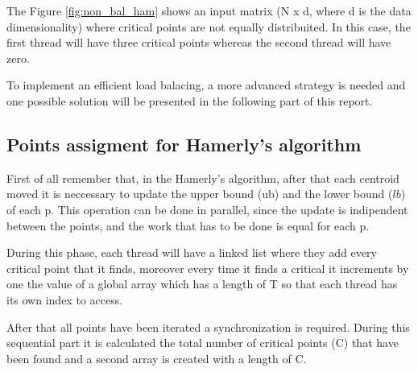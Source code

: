\documentclass{report}
\begin{document}
\begin{minipage}[b]{0.48\textwidth}
    The Figure \ref{fig:non_bal_ham} shows an input matrix (N x d, where d is the data dimensionality) where critical points are not  equally distribuited. In this case, the first thread will have three critical points whereas the second thread will have zero.

    To implement an efficient load balacing, a more advanced strategy is needed and one possible solution will be presented in the following part of this report. 
    
    \subsection*{Points assigment for Hamerly's algorithm}
    First of all remember that, in the Hamerly's algorithm, after that each centroid moved it is neccessary to update the upper bound (ub) and the lower bound ($lb$) of each p. This operation can be done in parallel, since the update is indipendent between the points, and the work that has to be done is equal for each p. 

    During this phase, each thread will have a linked list where they add every critical point that it finds, moreover every time it finds a critical it increments by one the value of a global array which has a length of T so that each thread has its own index to access.

    After that all points have been iterated a synchronization is required. During this sequential part it is calculated the total number of critical points (C) that have been found and a second array is created with a length of C.
  \end{minipage}
  \hspace{0.15in}
\end{document}
